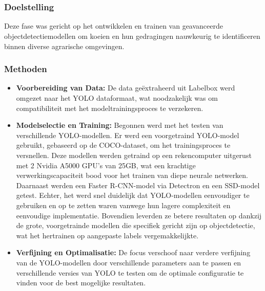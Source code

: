 \chapter{}%
\label{ch:objectdetectie}

\subsection{Doelstelling}
Deze fase was gericht op het ontwikkelen en trainen van geavanceerde objectdetectiemodellen om koeien en hun gedragingen nauwkeurig te identificeren binnen diverse agrarische omgevingen.

\subsection{Methoden}
\begin{itemize}
  \item \textbf{Voorbereiding van Data:}  De data geëxtraheerd uit Labelbox werd omgezet naar het YOLO dataformaat, wat noodzakelijk was om compatibiliteit met het modeltrainingsproces te verzekeren.
  \item \textbf{Modelselectie en Training:} Begonnen werd met het testen van verschillende YOLO-modellen. Er werd een voorgetraind YOLO-model gebruikt, gebaseerd op de COCO-dataset, om het trainingsproces te versnellen. 
  Deze modellen werden getraind op een rekencomputer uitgerust met 2 Nvidia A5000 GPU's van 25GB, wat een krachtige verwerkingscapaciteit bood voor het trainen van diepe neurale netwerken.
  Daarnaast werden een Faster R-CNN-model via Detectron en een SSD-model getest. Echter, het werd snel duidelijk dat YOLO-modellen eenvoudiger te gebruiken en op te zetten waren vanwege hun lagere complexiteit en eenvoudige implementatie. Bovendien leverden ze betere resultaten op dankzij de grote, voorgetrainde modellen die specifiek gericht zijn op objectdetectie, wat het hertrainen op aangepaste labels vergemakkelijkte.
  \item \textbf{Verfijning en Optimalisatie:} De focus verschoof naar verdere verfijning van de YOLO-modellen door verschillende parameters aan te passen en verschillende versies van YOLO te testen om de optimale configuratie te vinden voor de best mogelijke resultaten.
\end{itemize}

